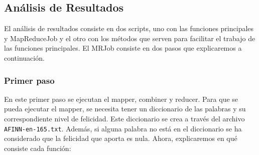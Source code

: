 \documentclass[12pt,a4paper]{article}
\begin{document}
\subsection{Análisis de Resultados}

El análisis de resultados consiste en dos scripts, uno con las funciones principales y MapReduceJob y el otro con los métodos que serven para facilitar el trabajo de las funciones principales. El MRJob  consiste en dos pasos que explicaremos a continuación.

\subsubsection{Primer paso}
En este primer paso se ejecutan el mapper, combiner y reducer. Para que se pueda ejecutar el mapper, se necesita tener un diccionario de las palabras y su correspondiente nivel de felicidad. Este diccionario se crea a través del archivo \texttt{AFINN-en-165.txt}. Además, si alguna palabra no está en el diccionario se ha considerado que la felicidad que aporta es nula. Ahora, explicaremos en qué consiste cada función:
\end{document}
